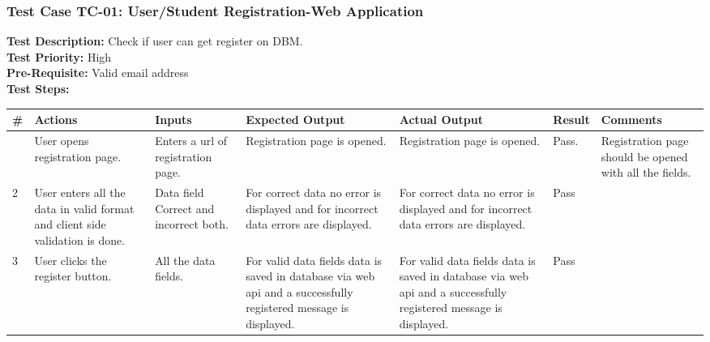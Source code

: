 \documentclass[12pt]{article}
\begin{document}
\subsubsection{Test Case TC-01: User/Student Registration-Web Application}
\textbf{Test Description: } Check if user can get register on DBM. \\
\textbf{Test Priority: } High \\
\textbf{Pre-Requisite: } Valid email address \\
\textbf{Test Steps: }
\begin{longtable}{ |>{\raggedright\arraybackslash} p{0.7cm} | >{\raggedright\arraybackslash}p{2cm}|>{\raggedright\arraybackslash} p{2cm} |>{\raggedright\arraybackslash} p{2.5cm} |>{\raggedright\arraybackslash} p{2.5cm} |>{\raggedright\arraybackslash} p{1.3cm} |>{\raggedright\arraybackslash} p{2.5cm} | } 
\hline
\textbf{\#}
& \textbf{Actions} 
& \textbf{Inputs}
& \textbf{Expected Output} 
& \textbf{Actual Output} 
& \textbf{Result} 
& \textbf{Comments} 
\\ 
\hline
1
& User opens registration page. 
& Enters a url of registration page.
& Registration page is opened.
& Registration page is opened.
& Pass.
& Registration page should be opened with all the fields.
\\ 
\hline

2 
& User enters all the data in valid format and client side validation is done.
& Data field Correct and incorrect both.
& For correct data no error is displayed and for incorrect data errors are displayed.
& For correct data no error is displayed and for incorrect data errors are displayed. 
& Pass
&  
\\ 
\hline


3
& User clicks the register button.
& All the data fields.
& For valid data fields data is saved in database via web api and a successfully registered message is displayed.
& For valid data fields data is saved in database via web api and a successfully registered message is displayed. 
& Pass
&  
\\ 
\hline

\end{longtable}
\end{document}
